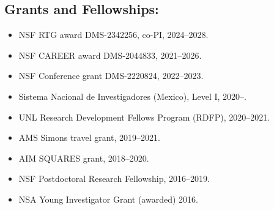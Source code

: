 \documentclass[11pt]{amsart}
\newenvironment{indentpar}[1]%
 {\begin{list}{}%
         {\setlength{\leftmargin}{#1}}%
         \item[]%
 }
 {\end{list}}
\newenvironment{inpar}
 {\begin{list}{}%
         {\setlength{\leftmargin}{5mm}}%
         \item[]%
 }
 {\end{list}}
\begin{document}
\subsection*{Grants and Fellowships:}
\begin{itemize}[leftmargin=9mm]
	\item NSF RTG award DMS-2342256, co-PI, 2024--2028.
	\item NSF CAREER award DMS-2044833, 2021--2026.
	\item NSF Conference grant DMS-2220824, 2022--2023.
	\item Sistema Nacional de Investigadores (Mexico), Level I, 2020--.
	\item UNL Research Development Fellows Program (RDFP), 2020--2021.
	\item AMS Simons travel grant, 2019--2021.
	\item AIM SQUARES grant, 2018--2020.
	\item NSF Postdoctoral Research Fellowship, 2016--2019.
	\item NSA Young Investigator Grant (awarded) 2016.
\end{itemize}


\thispagestyle{empty}

%
%
\end{document}
